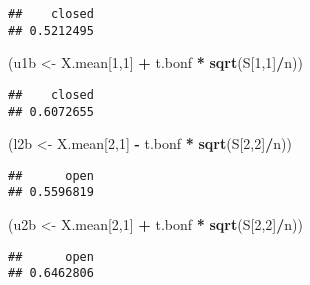 \documentclass[
]{article}
\newenvironment{Shaded}{\begin{snugshade}}{\end{snugshade}}
\newcommand{\DecValTok}[1]{\textcolor[rgb]{0.00,0.00,0.81}{#1}}
\newcommand{\KeywordTok}[1]{\textcolor[rgb]{0.13,0.29,0.53}{\textbf{#1}}}
\newcommand{\NormalTok}[1]{#1}
\newcommand{\OperatorTok}[1]{\textcolor[rgb]{0.81,0.36,0.00}{\textbf{#1}}}
\newcommand{\StringTok}[1]{\textcolor[rgb]{0.31,0.60,0.02}{#1}}
\begin{document}
\begin{verbatim}
##    closed 
## 0.5212495
\end{verbatim}

\begin{Shaded}
\begin{Highlighting}[]
\NormalTok{(u1b <-}\StringTok{ }\NormalTok{X.mean[}\DecValTok{1}\NormalTok{,}\DecValTok{1}\NormalTok{] }\OperatorTok{+}\StringTok{ }\NormalTok{t.bonf }\OperatorTok{*}\StringTok{ }\KeywordTok{sqrt}\NormalTok{(S[}\DecValTok{1}\NormalTok{,}\DecValTok{1}\NormalTok{]}\OperatorTok{/}\NormalTok{n))}
\end{Highlighting}
\end{Shaded}

\begin{verbatim}
##    closed 
## 0.6072655
\end{verbatim}

\begin{Shaded}
\begin{Highlighting}[]
\NormalTok{(l2b <-}\StringTok{ }\NormalTok{X.mean[}\DecValTok{2}\NormalTok{,}\DecValTok{1}\NormalTok{] }\OperatorTok{-}\StringTok{ }\NormalTok{t.bonf }\OperatorTok{*}\StringTok{ }\KeywordTok{sqrt}\NormalTok{(S[}\DecValTok{2}\NormalTok{,}\DecValTok{2}\NormalTok{]}\OperatorTok{/}\NormalTok{n))}
\end{Highlighting}
\end{Shaded}

\begin{verbatim}
##      open 
## 0.5596819
\end{verbatim}

\begin{Shaded}
\begin{Highlighting}[]
\NormalTok{(u2b <-}\StringTok{ }\NormalTok{X.mean[}\DecValTok{2}\NormalTok{,}\DecValTok{1}\NormalTok{] }\OperatorTok{+}\StringTok{ }\NormalTok{t.bonf }\OperatorTok{*}\StringTok{ }\KeywordTok{sqrt}\NormalTok{(S[}\DecValTok{2}\NormalTok{,}\DecValTok{2}\NormalTok{]}\OperatorTok{/}\NormalTok{n))}
\end{Highlighting}
\end{Shaded}

\begin{verbatim}
##      open 
## 0.6462806
\end{verbatim}
\end{document}
